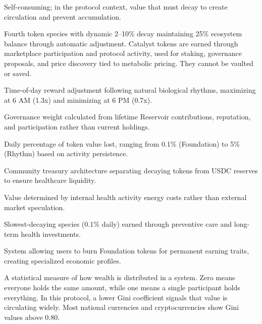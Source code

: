 \documentclass[11pt,letterpaper]{article}
\begin{document}
\begin{description}[style=nextline]
\item[Autophage]
Self-consuming; in the protocol context, value that must decay to create circulation and prevent accumulation.

\item[Catalyst Tokens]
Fourth token species with dynamic 2–10\% decay maintaining 25\% ecosystem balance through automatic adjustment. Catalyst tokens are earned through marketplace participation and protocol activity, used for staking, governance proposals, and price discovery tied to metabolic pricing. They cannot be vaulted or saved.


\item[Circadian Multiplier]
Time-of-day reward adjustment following natural biological rhythms, maximizing at 6 AM (1.3x) and minimizing at 6 PM (0.7x).

\item[Contribution Score]
Governance weight calculated from lifetime Reservoir contributions, reputation, and participation rather than current holdings.

\item[Decay Rate ($\delta$)]
Daily percentage of token value lost, ranging from 0.1\% (Foundation) to 5\% (Rhythm) based on activity persistence.

\item[Dual-Chamber Reservoir]
Community treasury architecture separating decaying tokens from USDC reserves to ensure healthcare liquidity.

\item[Endogenous Price]
Value determined by internal health activity energy costs rather than external market speculation.

\item[Foundation Tokens]
Slowest-decaying species (0.1\% daily) earned through preventive care and long-term health investments.

\item[Genetic Adaptation]
System allowing users to burn Foundation tokens for permanent earning traits, creating specialized economic profiles.

\item[Gini Coefficient]
A statistical measure of how wealth is distributed in a system. Zero means everyone holds the same amount, while one means a single participant holds everything. In this protocol, a lower Gini coefficient signals that value is circulating widely. Most national currencies and cryptocurrencies show Gini values above 0.80.


\end{description}
\end{document}
